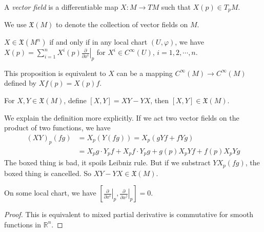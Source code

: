 \begin{defn}
    A \emph{vector field} is a differentiable map $X:M\to TM$ such that $X(p)\in T_pM$.
\end{defn}

\begin{symb}
    We use $\mathfrak{X}(M)$ to denote the collection of vector fields on $M$.
\end{symb}

\begin{prop}
    $X\in\mathfrak{X}(M^n)$ if and only if in any local chart $(U,\varphi)$, we have $X(p)=\sum_{i=1}^nX^i(p)\left.\frac{\partial{}}{\partial{x^i}}\right|_p$ for $X^i\in C^\infty(U)$, $i=1,2,\cdots,n$.
\end{prop}

This proposition is equivalent to $X$ can be a mapping $C^\infty(M)\to C^\infty(M)$ defined by $Xf(p)=X(p)f$.

\begin{defn}
    For $X,Y\in\mathfrak{X}(M)$, define $[X,Y]=XY-YX$, then $[X,Y]\in\mathfrak{X}(M)$.
\end{defn}
\begin{rem}
    We explain the definition more explicitly.
    If we act two vector fields on the product of two functions, we have
    \begin{align*}
        (XY)_p(fg)&=X_p(Y(fg))=X_p(gYf+fYg)\\
        &=\boxed{X_pg\cdot Y_pf+X_pf\cdot Y_pg}+g(p)X_pYf+f(p)X_pYg
    \end{align*}
    The boxed thing is bad, it spoils Leibniz rule.
    But if we substract $YX_p(fg)$, the boxed thing is cancelled.
    So $XY-YX\in\mathfrak{X}(M)$.
\end{rem}

\begin{prop}
    On some local chart, we have $\left[\left.\frac{\partial{}}{\partial{x^i}}\right|_p,\left.\frac{\partial{}}{\partial{x^j}}\right|_p\right]=0$.
\end{prop}
\begin{proof}
    This is equivalent to mixed partial derivative is commutative for smooth functions in $\mathbb{R}^n$.
\end{proof}